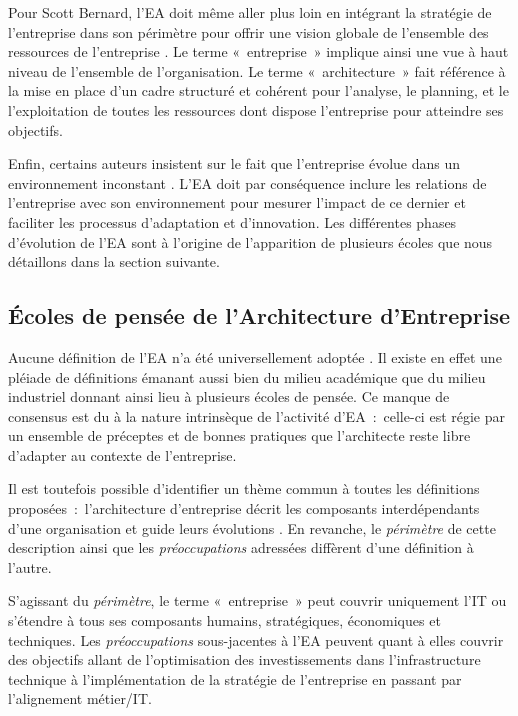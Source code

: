 Pour Scott Bernard, l'EA doit même aller plus loin en intégrant la stratégie de
l'entreprise dans son périmètre pour offrir une vision globale de l'ensemble
des ressources de l'entreprise \cite{bernard2012introduction}. Le terme
«~entreprise~» implique ainsi une vue à haut niveau de l'ensemble de
l'organisation. Le terme «~architecture~» fait référence à la mise en place
d'un cadre structuré et cohérent pour l'analyse, le planning, et le
l'exploitation de toutes les ressources dont dispose l'entreprise pour
atteindre ses objectifs.  

Enfin, certains auteurs insistent sur le fait que l'entreprise évolue dans un
environnement inconstant \cite{lapalme2012three}. L'EA doit par conséquence
inclure les relations de l'entreprise avec son environnement pour mesurer
l'impact de ce dernier et faciliter les processus d'adaptation et d'innovation.
Les différentes phases d'évolution de l'EA sont à l'origine de l'apparition de
plusieurs écoles que nous détaillons dans la section suivante. 


\subsection{Écoles de pensée de l'Architecture d'Entreprise} 
\label{Lapalme}

Aucune définition de l'EA n'a été universellement adoptée
\cite{mentz2012comparison} \cite{ranganathan2005enterprise}. Il existe en effet
une pléiade de définitions émanant aussi bien du milieu académique que du
milieu industriel donnant ainsi lieu à plusieurs écoles de pensée. Ce manque de
consensus est du à la nature intrinsèque de l'activité d'EA~:~celle-ci est
régie par un ensemble de préceptes et de bonnes pratiques que l'architecte
reste libre d'adapter au contexte de l'entreprise. 

Il est toutefois possible d'identifier un thème commun à toutes les définitions
proposées~:~l'architecture d'entreprise décrit les composants interdépendants
d'une organisation et guide leurs évolutions \cite{lapalme2012three}. En
revanche, le \textit{périmètre} de cette description ainsi que les
\textit{préoccupations} adressées diffèrent d'une définition à l'autre.

S'agissant du \textit{périmètre}, le terme «~entreprise~» peut couvrir
uniquement l'IT ou s'étendre à tous ses composants humains, stratégiques,
économiques et techniques. Les \textit{préoccupations} sous-jacentes à l'EA
peuvent quant à elles couvrir des objectifs allant de l'optimisation des
investissements dans l'infrastructure technique à l'implémentation de la
stratégie de l'entreprise en passant par l'alignement métier/IT. 

